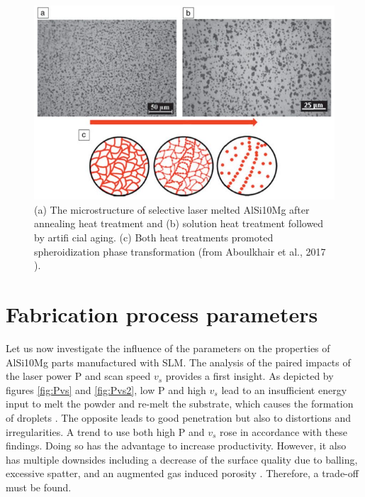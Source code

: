 \begin{figure}[ht]
	\centering
	\includegraphics[scale=0.60]{Images/microTT}
	\decoRule
	\caption[(a) The microstructure of selective laser melted AlSi10Mg after annealing heat
treatment and (b) solution heat treatment followed by artifi cial aging. (c) Both heat
treatments promoted spheroidization phase transformation. ]{(a) The microstructure of selective laser melted AlSi10Mg after annealing heat
treatment and (b) solution heat treatment followed by artifi cial aging. (c) Both heat
treatments promoted spheroidization phase transformation (from Aboulkhair et al., 2017 \parencite{aboulkhair2017}).}
	\label{fig:microTT}
\end{figure}

\section{Fabrication process parameters}
\label{pp}
Let us now investigate the influence of the parameters on the properties of AlSi10Mg parts manufactured with SLM. The analysis of the paired impacts of the laser power P and scan speed $v_s$ provides a first insight. As depicted by figures \ref{fig:Pvs} and \ref{fig:Pvs2}, low P and high $v_s$ lead to an insufficient energy input to melt the powder and re-melt the substrate, which causes the formation of droplets \parencite{Kempen110817} . The opposite leads to good penetration but also to distortions and irregularities.   A trend to use both high P and $v_s$ rose in accordance with these findings. Doing so has the advantage to increase productivity. However, it also has multiple downsides including a decrease of the surface quality due to balling, excessive spatter, and an augmented gas induced porosity \parencite{Mertens170406}. Therefore, a trade-off must be found. \\


